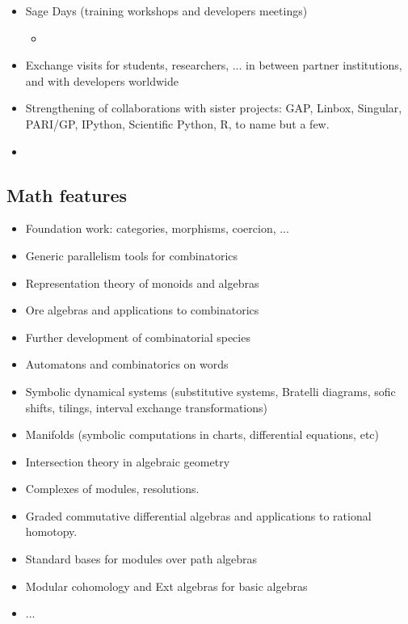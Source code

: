 \begin{itemize}
\item Sage Days (training workshops and developers meetings)
  \begin{itemize}
  \item {}
  \end{itemize}
\item Exchange visits for students, researchers, ... in between
  partner institutions, and with developers worldwide
\item Strengthening of collaborations with sister projects: GAP,
  Linbox, Singular, PARI/GP, IPython, Scientific Python, R, to name but a
  few.
\item {}
\end{itemize}



\subsection{Math features}

\begin{itemize}
\item Foundation work: categories, morphisms, coercion, ...
\item Generic parallelism tools for combinatorics
\item Representation theory of monoids and algebras
\item Ore algebras and applications to combinatorics
\item Further development of combinatorial species
\item Automatons and combinatorics on words
\item Symbolic dynamical systems (substitutive systems, Bratelli diagrams,
  sofic shifts, tilings, interval exchange transformations)
\item Manifolds (symbolic computations in charts, differential equations, etc)
\item Intersection theory in algebraic geometry
\item Complexes of modules, resolutions.
\item Graded commutative differential algebras and applications to rational homotopy.
\item Standard bases for modules over path algebras
\item Modular cohomology and Ext algebras for basic algebras
\item ...
\end{itemize}

